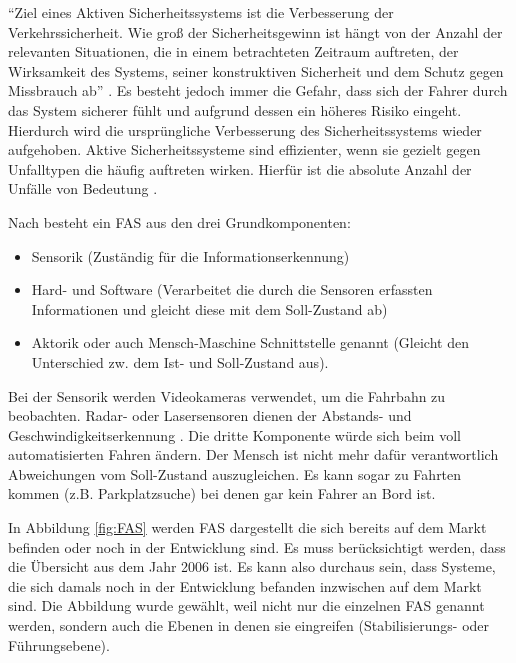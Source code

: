 \enquote{Ziel eines Aktiven Sicherheitssystems ist die Verbesserung der Verkehrssicherheit. Wie groß der Sicherheitsgewinn ist hängt von der Anzahl der relevanten Situationen, die in einem betrachteten Zeitraum auftreten, der Wirksamkeit des Systems, seiner konstruktiven Sicherheit und dem Schutz gegen Missbrauch ab} \parencite[S. 10]{Meitinger.2008}. Es besteht jedoch immer die Gefahr, dass sich der Fahrer durch das System sicherer fühlt und aufgrund dessen ein höheres Risiko eingeht. Hierdurch wird die ursprüngliche Verbesserung des Sicherheitssystems wieder aufgehoben. Aktive Sicherheitssysteme sind effizienter, wenn sie gezielt gegen Unfalltypen die  häufig auftreten wirken. Hierfür ist die absolute Anzahl der Unfälle von Bedeutung \parencite[S. 19]{Meitinger.2008}.

Nach \Textcite[S. 10]{Blakaj.14.09.2016} besteht ein \ac{FAS} aus den drei Grundkomponenten:

\begin{itemize}
	\item Sensorik (Zuständig für die Informationserkennung)
	\item Hard- und Software (Verarbeitet die durch die Sensoren erfassten Informationen und gleicht diese mit dem Soll-Zustand ab)
	\item Aktorik oder auch Mensch-Maschine Schnittstelle genannt (Gleicht den Unterschied zw. dem Ist- und Soll-Zustand aus).
\end{itemize}

Bei der Sensorik werden Videokameras verwendet, um die Fahrbahn zu beobachten. Radar- oder Lasersensoren dienen der Abstands- und Geschwindigkeitserkennung \parencite[S. 4f]{Schmidt.2010}. Die dritte Komponente würde sich beim voll automatisierten Fahren ändern. Der Mensch ist nicht mehr dafür verantwortlich Abweichungen vom Soll-Zustand auszugleichen. Es kann sogar zu Fahrten kommen (z.B. Parkplatzsuche) bei denen gar kein Fahrer an Bord ist.

In Abbildung \ref{fig:FAS} werden \ac{FAS} dargestellt die sich bereits auf dem Markt befinden oder noch in der Entwicklung sind. Es muss berücksichtigt werden, dass die Übersicht aus dem Jahr 2006 ist. Es kann also durchaus sein, dass Systeme, die sich damals noch in der Entwicklung befanden inzwischen auf dem Markt sind. Die Abbildung wurde gewählt, weil nicht nur die einzelnen \ac{FAS} genannt werden, sondern auch die Ebenen in denen sie eingreifen (Stabilisierungs- oder Führungsebene).

